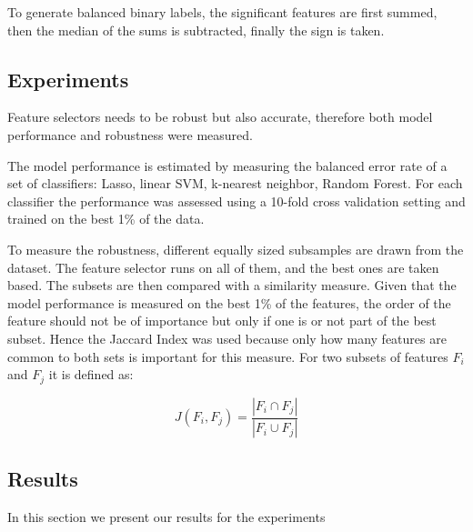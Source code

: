 \documentclass[twoside,11pt]{article}
\begin{document}
To generate balanced binary labels, the significant features are first summed, then the median of the sums is subtracted, finally the sign is taken. 





\subsection{Experiments}

Feature selectors needs to be robust but also accurate, therefore both model performance and robustness were measured.

The model performance is estimated by measuring the balanced error rate of a set of classifiers: Lasso, linear SVM, k-nearest neighbor, Random Forest. For each classifier the performance was assessed using a 10-fold cross validation setting and trained on the best 1\% of the data.

To measure the robustness, different equally sized subsamples are drawn from the dataset. The feature selector runs on all of them, and the best ones are taken based. The subsets are then compared with a similarity measure. Given that the model performance is measured on the best 1\% of the features, the order of the feature should not be of importance but only if one is or not part of the best subset. Hence the Jaccard Index was used because only how many features are common to both sets is important for this measure. For two subsets of features $F_i$ and $F_j$ it is defined as:

\begin{equation}
J(F_i, F_j) = \frac{| F_i \cap F_j |}{| F_i \cup F_j |}
\end{equation}


\subsection{Results}
In this section we present our results for the experiments
\end{document}
